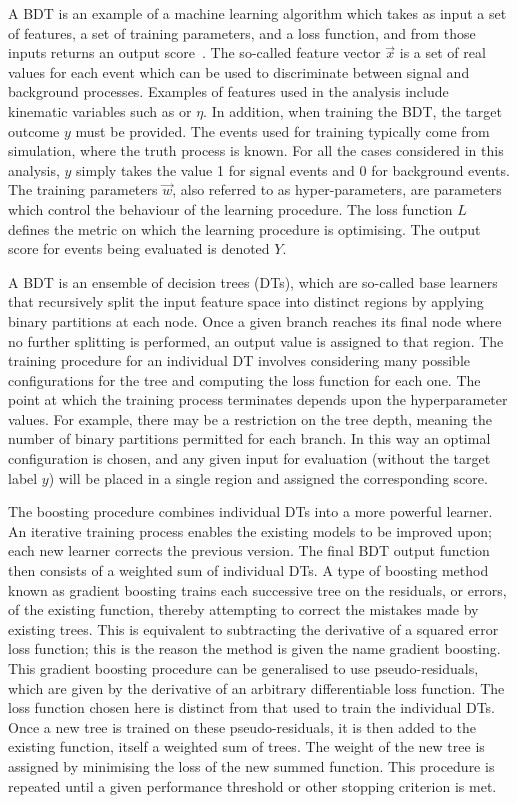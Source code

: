 A BDT is an example of a machine learning algorithm which takes as input a set of features, 
a set of training parameters, and a loss function, 
and from those inputs returns an output score~\cite{ElementsLearning}.
The so-called feature vector $\vec{x}$ is a set of real values for each event
which can be used to discriminate between signal and background processes. 
Examples of features used in the analysis include kinematic variables such as \pt or $\eta$.
In addition, when training the BDT, the target outcome $y$ must be provided.
The events used for training typically come from simulation, where the truth process is known.
For all the cases considered in this analysis, $y$ simply takes the value 1 for signal events
and 0 for background events.
The training parameters $\vec{w}$, also referred to as hyper-parameters, 
are parameters which control the behaviour of the learning procedure.
The loss function $L$ defines the metric on which the learning procedure is optimising.
The output score for events being evaluated is denoted $Y$.

A BDT is an ensemble of decision trees (DTs), 
which are so-called base learners that recursively split the input feature space into distinct regions
by applying binary partitions at each node.
Once a given branch reaches its final node where no further splitting is performed, 
an output value is assigned to that region.
The training procedure for an individual DT involves considering many possible configurations
for the tree and computing the loss function for each one.
The point at which the training process terminates depends upon the hyperparameter values.
For example, there may be a restriction on the tree depth, 
meaning the number of binary partitions permitted for each branch.
In this way an optimal configuration is chosen, 
and any given input for evaluation (without the target label $y$) 
will be placed in a single region and assigned the corresponding score.

The boosting procedure combines individual DTs into a more powerful learner.
An iterative training process enables the existing models to be improved upon; 
each new learner corrects the previous version.
The final BDT output function then consists of a weighted sum of individual DTs.
A type of boosting method known as gradient boosting trains each successive tree 
on the residuals, or errors, of the existing function, 
thereby attempting to correct the mistakes made by existing trees.
This is equivalent to subtracting the derivative of a squared error loss function;
this is the reason the method is given the name gradient boosting.
This gradient boosting procedure can be generalised to use pseudo-residuals, 
which are given by the derivative of an arbitrary differentiable loss function.
The loss function chosen here is distinct from that used to train the individual DTs.
Once a new tree is trained on these pseudo-residuals, it is then added to the existing function, 
itself a weighted sum of trees.
The weight of the new tree is assigned by minimising the loss of the new summed function.
This procedure is repeated until a given performance threshold or other stopping criterion is met.


